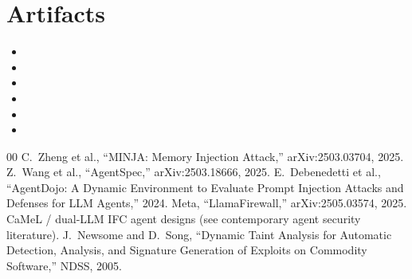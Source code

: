 \documentclass[conference]{IEEEtran}
\begin{document}
\section*{Artifacts}
\begin{itemize}
\setlength{\itemsep}{1pt}
\setlength{\parsep}{0pt}
\setlength{\parskip}{0pt}
\item {}
\item {}
\item {}
\item {}
\item {}
\item {}
\end{itemize}

\balance
\begin{thebibliography}{00}
 C.~Zheng et al., ``MINJA: Memory Injection Attack,'' arXiv:2503.03704, 2025.
 Z.~Wang et al., ``AgentSpec,'' arXiv:2503.18666, 2025.
 E.~Debenedetti et al., ``AgentDojo: A Dynamic Environment to Evaluate
Prompt Injection Attacks and Defenses for LLM Agents,'' 2024.
 Meta, ``LlamaFirewall,'' arXiv:2505.03574, 2025.
 CaMeL / dual-LLM IFC agent designs (see contemporary agent security literature).
 J.~Newsome and D.~Song, ``Dynamic Taint Analysis for Automatic Detection,
Analysis, and Signature Generation of Exploits on Commodity Software,'' NDSS, 2005.
\end{thebibliography}
\end{document}
